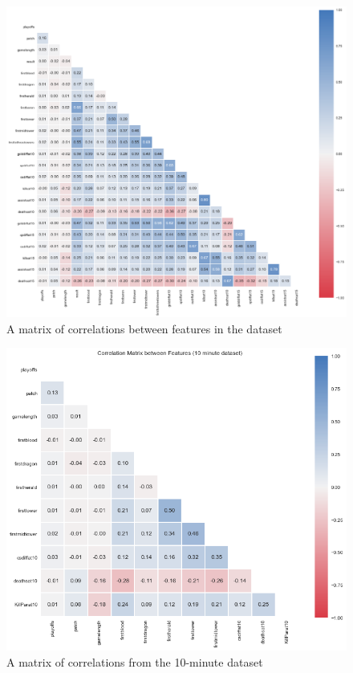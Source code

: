 \begin{figure}[h!]
    \centering
    \includegraphics[width=1\textwidth]{figures/CorrMat1}
    \caption{A matrix of correlations between features in the dataset}
    \label{fig:CorrMat1}
\end{figure}

\begin{figure}[h!]
    \centering
    \includegraphics[width=1\textwidth]{figures/CorrMat10}
    \caption{A matrix of correlations from the 10-minute dataset}
    \label{fig:CorrMat10}
\end{figure}

